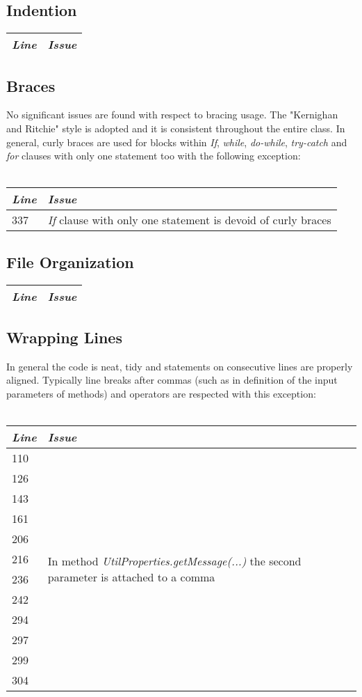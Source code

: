\documentclass[11pt,a4paper]{report}
\begin{document}
\subsection{Indention}
\begin{tabularx}{\textwidth}{|l|X|}
	\hline
	\textit{Line} & \textit{Issue}\\
	\hline
\end{tabularx}
\subsection{Braces}
No significant issues are found with respect to bracing usage. The "Kernighan and Ritchie" style is adopted and it is consistent throughout the entire class. In general, curly braces are used for blocks within \textit{If}, \textit{while}, \textit{do-while}, \textit{try-catch} and \textit{for} clauses with only one statement too with the following exception:
\\\\
\begin{tabularx}{\textwidth}{|l|X|}
	\hline
	\textit{Line} & \textit{Issue}\\
	\hline
	337 & \multirow{1}{*}{\textit{If} clause with only one statement is devoid of curly braces}\\
	\hline
\end{tabularx}
\subsection{File Organization}
\begin{tabularx}{\textwidth}{|l|X|}
	\hline
	\textit{Line} & \textit{Issue}\\
	\hline
\end{tabularx}
\subsection{Wrapping Lines}
In general the code is neat, tidy and statements on consecutive lines are properly aligned. Typically line breaks after commas (such as in definition of the input parameters of methods) and operators are respected with this exception:
\\\\
\begin{tabularx}{\textwidth}{|l|X|}
	\hline
	\textit{Line} & \textit{Issue}\\
	\hline
	110 & \multirow{12}{*}{In method \textit{UtilProperties.getMessage(...)} the second parameter is attached to a comma}\\
	126 & \\
	143 & \\
	161 & \\
	206 & \\
	216 & \\
	236 & \\
	242 & \\
	294 & \\
	297 & \\
	299 & \\
	304 & \\
	\hline
\end{tabularx}
\end{document}
